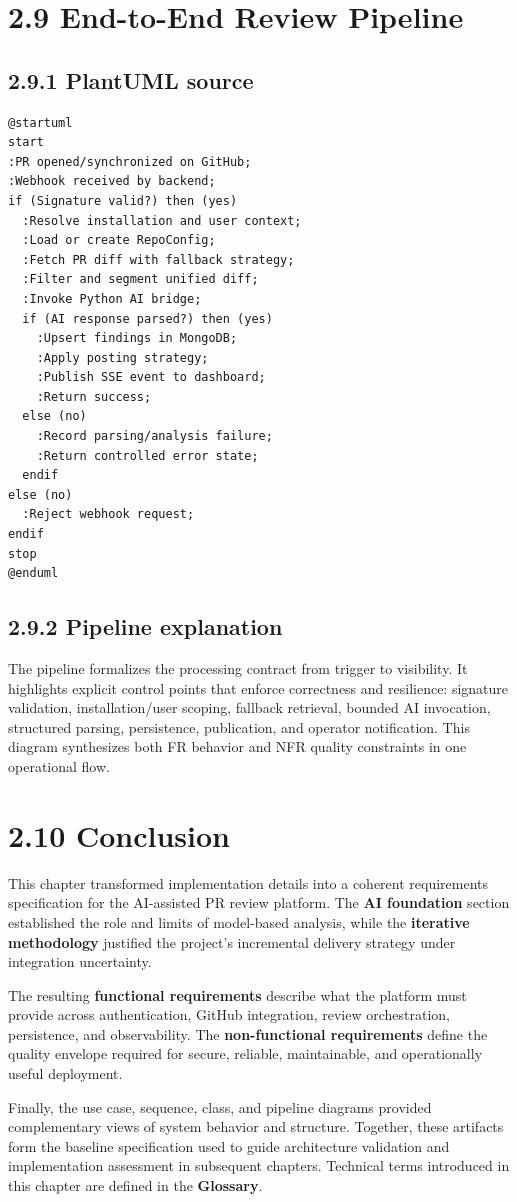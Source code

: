 \section{2.9 End-to-End Review Pipeline}

\subsection{2.9.1 PlantUML source}

\begin{lstlisting}[caption={End-to-end review pipeline (PlantUML source)},label={lst:pipeline_diagram}]
@startuml
start
:PR opened/synchronized on GitHub;
:Webhook received by backend;
if (Signature valid?) then (yes)
  :Resolve installation and user context;
  :Load or create RepoConfig;
  :Fetch PR diff with fallback strategy;
  :Filter and segment unified diff;
  :Invoke Python AI bridge;
  if (AI response parsed?) then (yes)
    :Upsert findings in MongoDB;
    :Apply posting strategy;
    :Publish SSE event to dashboard;
    :Return success;
  else (no)
    :Record parsing/analysis failure;
    :Return controlled error state;
  endif
else (no)
  :Reject webhook request;
endif
stop
@enduml
\end{lstlisting}

\subsection{2.9.2 Pipeline explanation}

The pipeline formalizes the processing contract from trigger to visibility. It highlights explicit control points that enforce correctness and resilience: signature validation, installation/user scoping, fallback retrieval, bounded AI invocation, structured parsing, persistence, publication, and operator notification. This diagram synthesizes both FR behavior and NFR quality constraints in one operational flow.

\section{2.10 Conclusion}

This chapter transformed implementation details into a coherent requirements specification for the AI-assisted PR review platform. The \textbf{AI foundation} section established the role and limits of model-based analysis, while the \textbf{iterative methodology} justified the project’s incremental delivery strategy under integration uncertainty.

The resulting \textbf{functional requirements} describe what the platform must provide across authentication, GitHub integration, review orchestration, persistence, and observability. The \textbf{non-functional requirements} define the quality envelope required for secure, reliable, maintainable, and operationally useful deployment.

Finally, the use case, sequence, class, and pipeline diagrams provided complementary views of system behavior and structure. Together, these artifacts form the baseline specification used to guide architecture validation and implementation assessment in subsequent chapters. Technical terms introduced in this chapter are defined in the \textbf{Glossary}.
